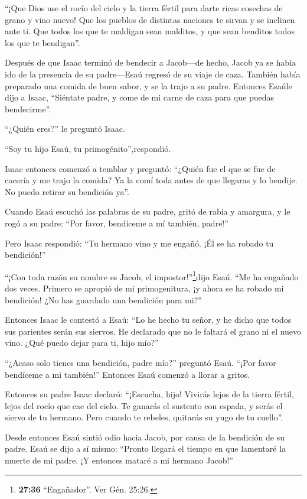  ``¡Que Dios use el rocío del cielo y la tierra fértil para
darte ricas cosechas de grano y vino nuevo!  Que los
pueblos de distintas naciones te sirvan y se inclinen ante ti. Que todos
los que te maldigan sean malditos, y que sean benditos todos los que te
bendigan''.

 Después de que Isaac terminó de bendecir a Jacob---de
hecho, Jacob ya se había ido de la presencia de su padre---Esaú regresó
de su viaje de caza.  También había preparado una comida de
buen sabor, y se la trajo a su padre. Entonces Esaúle dijo a Isaac,
``Siéntate padre, y come de mi carne de caza para que puedas
bendecirme''.

 ``¿Quién eres?'' le preguntó Isaac.

``Soy tu hijo Esaú, tu primogénito'',respondió.

 Isaac entonces comenzó a temblar y preguntó: ``¿Quién fue
el que se fue de cacería y me trajo la comida? Ya la comí toda antes de
que llegaras y lo bendije. No puedo retirar su bendición ya''.

 Cuando Esaú escuchó las palabras de su padre, gritó de
rabia y amargura, y le rogó a su padre: ``Por favor, bendíceme a mí
también, padre!''

 Pero Isaac respondió: ``Tu hermano vino y me engañó. ¡Él
se ha robado tu bendición!''

 ``¡Con toda razón su nombre es Jacob, el
impostor!''\footnote{\textbf{27:36} ``Engañador''. Ver Gén. 25:26.}dijo
Esaú. ``Me ha engañado dos veces. Primero se apropió de mi
primogenitura, ¡y ahora se ha robado mi bendición! ¿No has guardado una
bendición para mi?''

 Entonces Isaac le contestó a Esaú: ``Lo he hecho tu señor,
y he dicho que todos sus parientes serán sus siervos. He declarado que
no le faltará el grano ni el nuevo vino. ¿Qué puedo dejar para ti, hijo
mío?''

 ``¿Acaso solo tienes una bendición, padre mío?'' preguntó
Esaú. ``¡Por favor bendíceme a mi también!'' Entonces Esaú comenzó a
llorar a gritos.

 Entonces su padre Isaac declaró: ``¡Escucha, hijo! Vivirás
lejos de la tierra fértil, lejos del rocío que cae del cielo.
 Te ganarás el sustento con espada, y serás el siervo de tu
hermano. Pero cuando te rebeles, quitarás su yugo de tu cuello''.

 Desde entonces Esaú sintió odio hacia Jacob, por causa de
la bendición de su padre. Esaú se dijo a sí mismo: ``Pronto llegará el
tiempo en que lamentaré la muerte de mi padre. ¡Y entonces mataré a mi
hermano Jacob!''

